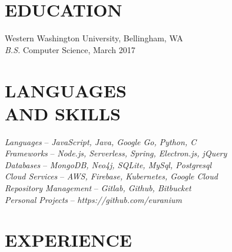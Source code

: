 \documentclass[line,margin]{res}
\begin{document}
\address{360.931.3237 $|$ rainierharvey@gmail.com $|$ nulldev.ninja $|$ github.com/euranium}

\begin{resume}

\section{EDUCATION}
	{\sf Western Washington University}, Bellingham, WA \\
	{\sl B.S.} Computer Science, { March 2017} \\

\section{LANGUAGES\\AND SKILLS}
	{\sl Languages} -- {\sl JavaScript, Java, Google Go, Python, C}\\
	{\sl Frameworks} -- {\sl Node.js, Serverless, Spring, Electron.js, jQuery} \\
	{\sl Databases} -- {\sl MongoDB, Neo4j, SQLite, MySql, Postgresql} \\
	{\sl Cloud Services} -- {\sl AWS, Firebase, Kubernetes, Google Cloud} \\
	{\sl Repository Management} -- {\sl Gitlab, Github, Bitbucket}\\
	{\sl Personal Projects} -- {\sl https://github.com/euranium}\\

\section{EXPERIENCE}


\end{resume}
\end{document}
